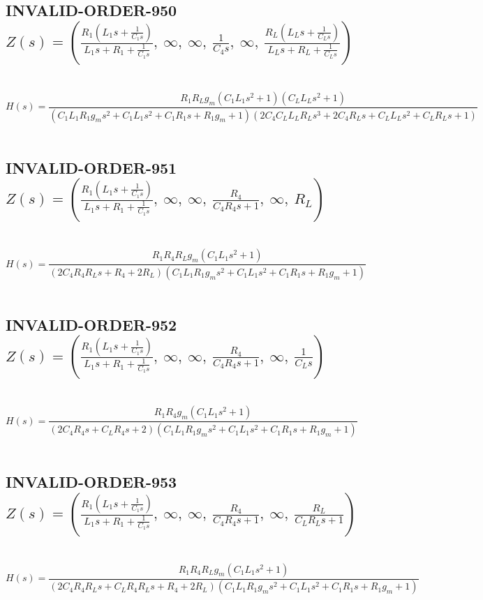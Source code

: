 \documentclass{article}
\begin{document}
\subsection{INVALID-ORDER-950 $Z(s) = \left( \frac{R_{1} \left(L_{1} s + \frac{1}{C_{1} s}\right)}{L_{1} s + R_{1} + \frac{1}{C_{1} s}}, \  \infty, \  \infty, \  \frac{1}{C_{4} s}, \  \infty, \  \frac{R_{L} \left(L_{L} s + \frac{1}{C_{L} s}\right)}{L_{L} s + R_{L} + \frac{1}{C_{L} s}}\right)$ } \ 
\textbf{\[H(s) = \frac{R_{1} R_{L} g_{m} \left(C_{1} L_{1} s^{2} + 1\right) \left(C_{L} L_{L} s^{2} + 1\right)}{\left(C_{1} L_{1} R_{1} g_{m} s^{2} + C_{1} L_{1} s^{2} + C_{1} R_{1} s + R_{1} g_{m} + 1\right) \left(2 C_{4} C_{L} L_{L} R_{L} s^{3} + 2 C_{4} R_{L} s + C_{L} L_{L} s^{2} + C_{L} R_{L} s + 1\right)}\] } \ 
\subsection{INVALID-ORDER-951 $Z(s) = \left( \frac{R_{1} \left(L_{1} s + \frac{1}{C_{1} s}\right)}{L_{1} s + R_{1} + \frac{1}{C_{1} s}}, \  \infty, \  \infty, \  \frac{R_{4}}{C_{4} R_{4} s + 1}, \  \infty, \  R_{L}\right)$ } \ 
\textbf{\[H(s) = \frac{R_{1} R_{4} R_{L} g_{m} \left(C_{1} L_{1} s^{2} + 1\right)}{\left(2 C_{4} R_{4} R_{L} s + R_{4} + 2 R_{L}\right) \left(C_{1} L_{1} R_{1} g_{m} s^{2} + C_{1} L_{1} s^{2} + C_{1} R_{1} s + R_{1} g_{m} + 1\right)}\] } \ 
\subsection{INVALID-ORDER-952 $Z(s) = \left( \frac{R_{1} \left(L_{1} s + \frac{1}{C_{1} s}\right)}{L_{1} s + R_{1} + \frac{1}{C_{1} s}}, \  \infty, \  \infty, \  \frac{R_{4}}{C_{4} R_{4} s + 1}, \  \infty, \  \frac{1}{C_{L} s}\right)$ } \ 
\textbf{\[H(s) = \frac{R_{1} R_{4} g_{m} \left(C_{1} L_{1} s^{2} + 1\right)}{\left(2 C_{4} R_{4} s + C_{L} R_{4} s + 2\right) \left(C_{1} L_{1} R_{1} g_{m} s^{2} + C_{1} L_{1} s^{2} + C_{1} R_{1} s + R_{1} g_{m} + 1\right)}\] } \ 
\subsection{INVALID-ORDER-953 $Z(s) = \left( \frac{R_{1} \left(L_{1} s + \frac{1}{C_{1} s}\right)}{L_{1} s + R_{1} + \frac{1}{C_{1} s}}, \  \infty, \  \infty, \  \frac{R_{4}}{C_{4} R_{4} s + 1}, \  \infty, \  \frac{R_{L}}{C_{L} R_{L} s + 1}\right)$ } \ 
\textbf{\[H(s) = \frac{R_{1} R_{4} R_{L} g_{m} \left(C_{1} L_{1} s^{2} + 1\right)}{\left(2 C_{4} R_{4} R_{L} s + C_{L} R_{4} R_{L} s + R_{4} + 2 R_{L}\right) \left(C_{1} L_{1} R_{1} g_{m} s^{2} + C_{1} L_{1} s^{2} + C_{1} R_{1} s + R_{1} g_{m} + 1\right)}\] } \ 
\end{document}
